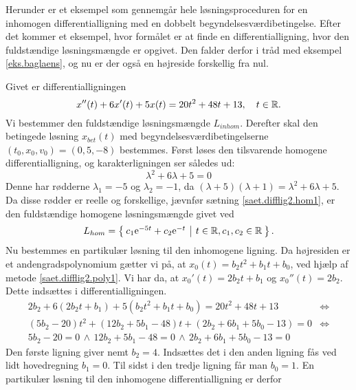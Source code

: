 Herunder er et eksempel som gennemgår hele løsningsproceduren for en inhomogen differentialligning med en dobbelt begyndelsesværdibetingelse. Efter det kommer et eksempel, hvor formålet er at finde en differentialligning, hvor den fuldstændige løs\-nings\-mæng\-de er opgivet. Den falder derfor i tråd med eksempel \ref{eks.baglaens}, og nu er der også en højreside forskellig fra nul.

\begin{example} \label{eks.difflig2.eksent21}
Givet er differentialligningen
\begin{equation}
x''(t) + 6x'(t) + 5x(t) = 20t^2 + 48t + 13, \quad t \in \mathbb{R}.
\end{equation}
Vi bestemmer den fuldstændige løsningsmængde $ L_{inhom} $. Derefter skal den betingede løsning $ x_{bet}(t) $ med begyndelsesværdibetingelserne $ (t_0,x_0,v_0) = (0,5,-8) $ bestemmes.\bs
Først løses den tilsvarende homogene differentialligning, og karakterligningen ser således ud:
\begin{equation}
\lambda^2 + 6\lambda + 5 = 0
\end{equation}
Denne har rødderne $ \lambda_1 = -5 $ og $ \lambda_2 = -1 $, da $ (\lambda + 5)(\lambda + 1) = \lambda^2 + 6\lambda + 5 $. Da disse rødder er reelle og forskellige, jævnfør sætning \ref{saet.difflig2.hom1}, er den fuldstændige homogene løsningsmængde givet ved
\begin{equation}
L_{hom} = \left\lbrace \hspace*{-1mm} \begin{array}{c|c} c_1 \mathrm{e}^{-5t} + c_2 \mathrm{e}^{-t} &  t \in \mathbb{R}, c_1,c_2 \in \mathbb{R} \end{array} \hspace*{-1mm} \right\rbrace.
\end{equation}
Nu bestemmes en partikulær løsning til den inhomogene ligning. Da højresiden er et andengradspolynomium gætter vi på, at $ x_{0}(t) = b_2t^2 + b_1t + b_0 $, ved hjælp af metode \ref{saet.difflig2.poly1}. Vi har da, at $ x_{0}'(t) = 2b_2t + b_1 $ og $ x_{0}''(t) = 2b_2 $. Dette indsættes i differentialligningen.
\begin{equation}
\begin{aligned}
2b_2 + 6(2b_2t + b_1) + 5(b_2t^2 + b_1t + b_0) = 20t^2 + 48t + 13 &\Leftrightarrow \\
(5b_2 - 20)t^2 + (12b_2 + 5b_1 - 48)t + (2b_2 + 6b_1 + 5b_0 - 13) = 0 &\Leftrightarrow \\
5b_2 - 20 = 0 \, \wedge \, 12b_2 + 5b_1 - 48 = 0 \, \wedge \, 2b_2 + 6b_1 + 5b_0 - 13 = 0 & 
\end{aligned}
\end{equation}
Den første ligning giver nemt $ b_2 = 4 $. Indsættes det i den anden ligning fås ved lidt hovedregning $ b_1 = 0 $. Til sidst i den tredje ligning får man $ b_0 = 1 $. En partikulær løsning til den inhomogene differentialligning er derfor

\end{example}
